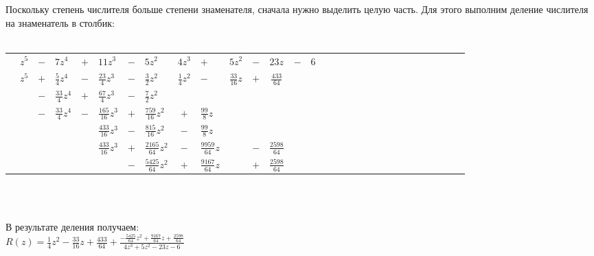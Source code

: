 \documentclass[12pt, a4paper]{article}
\begin{document}
Поскольку степень числителя больше степени знаменателя, сначала
нужно выделить целую часть. Для этого
выполним деление числителя на знаменатель в столбик:\\\\
\begin{spacing}{1.4}
    \begin{tabular}{*{15}{cp{0.55cm}}}
        & $z^5$ & $-$ & $7z^4$            & $+$ & $11z^3$             & $-$ & $5z^2$               & \vline
        $4z^3$            & $+$                & $5z^2$           & $-$ & $23z$              & $-$ & $6$ \\
        \cline{1-1}\cline{9-15}
        & $z^5$ & $+$ & $\frac{5}{4}z^4$  & $-$ & $\frac{23}{4}z^3$   & $-$ & $\frac{3}{2}z^2$     & \vline
        $\frac{1}{4}z^2$  & $-$                & $\frac{33}{16}z$ & $+$ & $\frac{433}{64}$   &     & \\
        \cline{2-8}
        &       & $-$ & $\frac{33}{4}z^4$ & $+$ & $\frac{67}{4}z^3$   & $-$ & $\frac{7}{2}z^2$     &
                          &                    &                  &     &                    &     & \\
        \cline{1-1}
        &       & $-$ & $\frac{33}{4}z^4$ & $-$ & $\frac{165}{16}z^3$ & $+$ & $\frac{759}{16}z^2$  &
        $+$               & $\frac{99}{8}z$    &                  &     &                    &     & \\
        \cline{4-10}
        &       &     &                   &     & $\frac{433}{16}z^3$ & $-$ & $\frac{815}{16}z^2$ &
        $-$               & $\frac{99}{8}z$    &                  &     &                    &     & \\
        \cline{1-1}
        &       &     &                   &     & $\frac{433}{16}z^3$ & $+$ & $\frac{2165}{64}z^2$ &
        $-$               & $\frac{9959}{64}z$ &                  & $-$ & $\frac{2598}{64}$  &     & \\
        \cline{6-13}
        &       &     &                   &     &                     & $-$ & $\frac{5425}{64}z^2$ &
        $+$               & $\frac{9167}{64}z$ &                  & $+$ & $\frac{2598}{64}$  &     & \\
    \end{tabular}\\\\
\end{spacing}
%
%
В результате деления получаем:\\
\begin{math}
    R(z) = \frac{1}{4}z^2 - \frac{33}{16}z + \frac{433}{64} +
    \frac{-\frac{5425}{64}z^2 + \frac{9167}{64}z + \frac{2598}{64}}
    {4z^3 + 5z^2 - 23z - 6}
\end{math}\\\\
\end{document}
